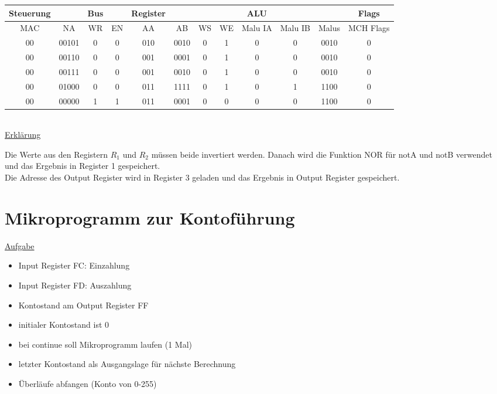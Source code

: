 \documentclass[paper=a4, fontsize=11pt]{scrartcl}
\numberwithin{equation}{section}
\numberwithin{figure}{section}
\numberwithin{table}{section}
\begin{document}
\begin{tabular}{|cc|cc|cccc|ccc|c|}
\hline
Steuerung & & Bus & & Register & & & & ALU & & & Flags \\
\hline
MAC & NA & WR & EN & AA & AB & WS & WE & Malu IA & Malu IB & Malus & MCH Flags \\
\hline
00 & 00101 & 0 & 0 & 010 & 0010 & 0 & 1 & 0 & 0 & 0010 & 0 \\
\hline
00 & 00110 & 0 & 0 & 001 & 0001 & 0 & 1 & 0 & 0 & 0010 & 0 \\
\hline
00 & 00111 & 0 & 0 & 001 & 0010 & 0 & 1 & 0 & 0 & 0010 & 0 \\
\hline
00 & 01000 & 0 & 0 & 011 & 1111 & 0 & 1 & 0 & 1 & 1100 & 0 \\
\hline
00 & 00000 & 1 & 1 & 011 & 0001 & 0 & 0 & 0 & 0 & 1100 & 0 \\
\hline
\end{tabular} \\

\underline{Erklärung}

Die Werte aus den Registern $R_{1}$ und $R_{2}$ müssen beide invertiert werden. Danach wird die Funktion NOR für notA und notB verwendet und das Ergebnis in Register 1 gespeichert. \\
Die Adresse des Output Register wird in Register 3 geladen und das Ergebnis in Output Register gespeichert.


\newpage

\section{Mikroprogramm zur Kontoführung}

\underline{Aufgabe}
\begin{itemize}
\item Input Register FC: Einzahlung
\item Input Register FD: Auszahlung
\item Kontostand am Output Register FF
\item initialer Kontostand ist 0
\item bei continue soll Mikroprogramm laufen (1 Mal)
\item letzter Kontostand als Ausgangslage für nächste Berechnung
\item Überläufe abfangen (Konto von 0-255)
\end{itemize} \\
\end{document}
